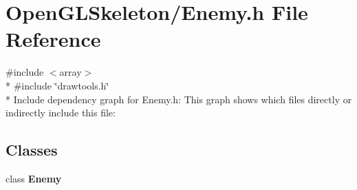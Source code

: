 \section{Open\+G\+L\+Skeleton/\+Enemy.h File Reference}
\label{_enemy_8h}
{\ttfamily \#include $<$array$>$}\\*
{\ttfamily \#include \char`\"{}drawtools.\+h\char`\"{}}\\*
Include dependency graph for Enemy.\+h\+:
This graph shows which files directly or indirectly include this file\+:
\subsection*{Classes}
\begin{DoxyCompactItemize}
\item 
class {\bf Enemy}
\end{DoxyCompactItemize}
